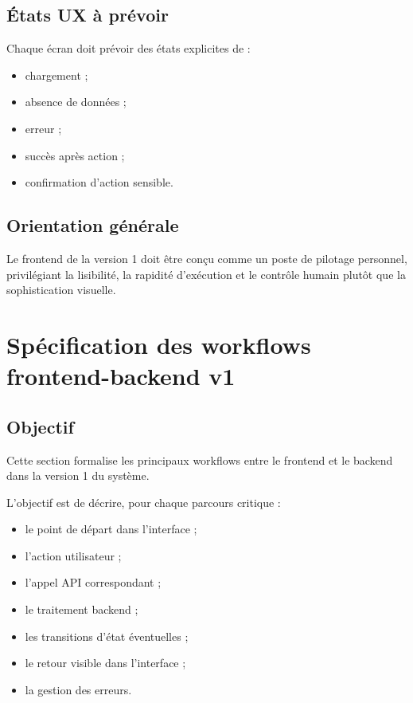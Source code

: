 \documentclass[11pt,a4paper]{article}
\begin{document}
\subsection{États UX à prévoir}

Chaque écran doit prévoir des états explicites de :

\begin{itemize}
    \item chargement ;
    \item absence de données ;
    \item erreur ;
    \item succès après action ;
    \item confirmation d’action sensible.
\end{itemize}

\subsection{Orientation générale}

Le frontend de la version 1 doit être conçu comme un poste de pilotage personnel, privilégiant la lisibilité, la rapidité d’exécution et le contrôle humain plutôt que la sophistication visuelle.

\section{Spécification des workflows frontend-backend v1}

\subsection{Objectif}

Cette section formalise les principaux workflows entre le frontend et le backend dans la version 1 du système.

L’objectif est de décrire, pour chaque parcours critique :

\begin{itemize}
    \item le point de départ dans l’interface ;
    \item l’action utilisateur ;
    \item l’appel API correspondant ;
    \item le traitement backend ;
    \item les transitions d’état éventuelles ;
    \item le retour visible dans l’interface ;
    \item la gestion des erreurs.
\end{itemize}
\end{document}
